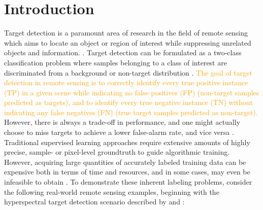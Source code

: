 \chapter{Introduction}
\vspace{1cm}

Target detection is a paramount area of research in the field of remote sensing which aims to locate an object or region of interest while suppressing unrelated objects and information. \citep{Geng2017TargetDetection,Chaudhuri1995TargetDetection}.  Target detection can be formulated as a two-class classification problem where samples belonging to a class of interest are discriminated from a background or non-target distribution \citep{Zare2016MIACE,Geng2017TargetDetection,Chaudhuri1995TargetDetection}.  \textcolor{orange}{The goal of target detection in remote sensing is to correctly identify every true positive instance (TP) in a given scene while indicating no false positives (FP) (non-target samples predicted as targets), and to identify every true negative instance (TN) without indicating any false negatives (FN) (true target samples predicted as non-target).}  However, there is always a trade-off in performance, and one might actually choose to miss targets to achieve a lower false-alarm rate, and vice versa \citep{WeinbergerFalseAlarms}.  Traditional supervised learning approaches require extensive amounts of highly precise, sample- or pixel-level groundtruth to guide algorithmic training.  However, acquiring large quantities  of accurately labeled training data can be expensive both in terms of time and resources, and in some cases, may even be infeasible to obtain \citep{Xu2014LargeMarginWeaklySupervisedDR}.  To demonstrate these inherent labeling problems, consider the following real-world remote sensing examples, beginning with the hyperspectral target detection scenario described by \cite{Du2017Thesis} and \cite{Bocinsky2019Thesis}:


